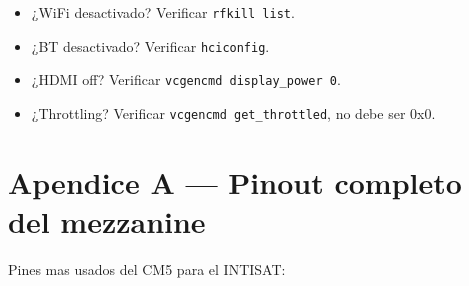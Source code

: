 \documentclass[11pt,a4paper,oneside,openright]{book}
\begin{document}
\begin{itemize}[leftmargin=2em]
  \item ¿WiFi desactivado? Verificar \texttt{rfkill list}.
  \item ¿BT desactivado? Verificar \texttt{hciconfig}.
  \item ¿HDMI off? Verificar \texttt{vcgencmd display\_power 0}.
  \item ¿Throttling? Verificar \texttt{vcgencmd get\_throttled}, no debe ser 0x0.
\end{itemize}

\appendix
\chapter{Apendice A --- Pinout completo del mezzanine}

Pines mas usados del CM5 para el INTISAT:
\end{document}
